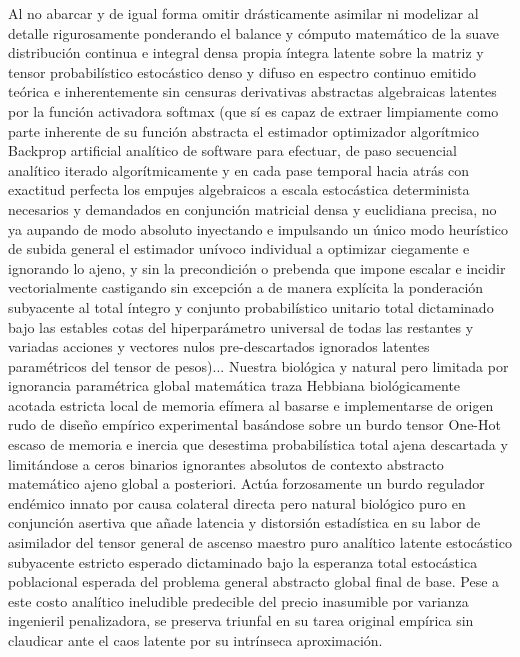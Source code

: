\documentclass[a4paper,12pt,twocolumn]{article}
\begin{document}
Al no abarcar y de igual forma omitir drásticamente asimilar ni modelizar al detalle rigurosamente ponderando el balance y cómputo matemático de la suave distribución continua e integral densa propia íntegra latente sobre la matriz y tensor probabilístico estocástico denso y difuso en espectro continuo emitido teórica e inherentemente sin censuras derivativas abstractas algebraicas latentes por la función activadora softmax (que sí es capaz de extraer limpiamente como parte inherente de su función abstracta el estimador optimizador algorítmico Backprop artificial analítico de software para efectuar, de paso secuencial analítico iterado algorítmicamente y en cada pase temporal hacia atrás con exactitud perfecta los empujes algebraicos a escala estocástica determinista necesarios y demandados en conjunción matricial densa y euclidiana precisa, no ya aupando de modo absoluto inyectando e impulsando un único modo heurístico de subida general el estimador unívoco individual a optimizar ciegamente e ignorando lo ajeno, y sin la precondición o prebenda que impone escalar e incidir vectorialmente castigando sin excepción a de manera explícita la ponderación subyacente al total íntegro y conjunto probabilístico unitario total dictaminado bajo las estables cotas del hiperparámetro universal de todas las restantes y variadas acciones y vectores nulos pre-descartados ignorados latentes paramétricos del tensor de pesos)... Nuestra biológica y natural pero limitada por ignorancia paramétrica global matemática traza Hebbiana biológicamente acotada estricta local de memoria efímera al basarse e implementarse de origen rudo de diseño empírico experimental basándose sobre un burdo tensor One-Hot escaso de memoria e inercia que desestima probabilística total ajena descartada y limitándose a ceros binarios ignorantes absolutos de contexto abstracto matemático ajeno global a posteriori. Actúa forzosamente un burdo regulador endémico innato por causa colateral directa pero natural biológico puro en conjunción asertiva que añade latencia y distorsión estadística en su labor de asimilador del tensor general de ascenso maestro puro analítico latente estocástico subyacente estricto esperado dictaminado bajo la esperanza total estocástica poblacional esperada del problema general abstracto global final de base. Pese a este costo analítico ineludible predecible del precio inasumible por varianza ingenieril penalizadora, se preserva triunfal en su tarea original empírica sin claudicar ante el caos latente por su intrínseca aproximación.
\end{document}
